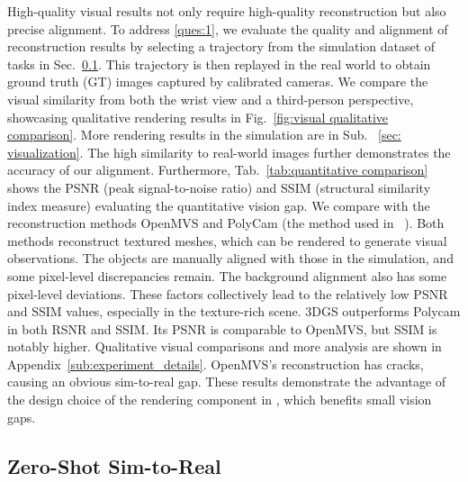 High-quality visual results not only require high-quality reconstruction but also precise alignment. To address \ref{ques:1}, we evaluate the quality and alignment of reconstruction results by selecting a trajectory from the simulation dataset of tasks in Sec.~\ref{sec:experment_sim2real_results}.
This trajectory is then replayed in the real world to obtain ground truth (GT) images captured by calibrated cameras. We compare the visual similarity from both the wrist view and a third-person perspective, showcasing qualitative rendering results in Fig.~\ref{fig:visual qualitative comparison}. More rendering results in the simulation are in Sub. ~\ref{sec: visualization}. The high similarity to real-world images further demonstrates the accuracy of our alignment. 
Furthermore, Tab.~\ref{tab:quantitative comparison} shows the PSNR (peak signal-to-noise ratio) and SSIM (structural similarity index measure) evaluating the quantitative vision gap. 
We compare \our with the reconstruction methods OpenMVS and PolyCam (the method used in ~\citet{ritotorne2024rialto}). Both methods reconstruct textured meshes, which can be rendered to generate visual observations.
The objects are manually aligned with those in the simulation, and some pixel-level discrepancies remain. The background alignment also has some pixel-level deviations. These factors collectively lead to the relatively low PSNR and SSIM values, especially in the texture-rich scene.
3DGS outperforms Polycam in both RSNR and SSIM. Its PSNR is comparable to OpenMVS, but SSIM is notably higher. Qualitative visual comparisons and more analysis are shown in Appendix~\ref{sub:experiment_details}. OpenMVS's reconstruction has cracks, causing an obvious sim-to-real gap. 
These results demonstrate the advantage of the design choice of the rendering component in \our, which benefits small vision gaps. 
\subsection{Zero-Shot Sim-to-Real}
\label{sec:experment_sim2real_results}

